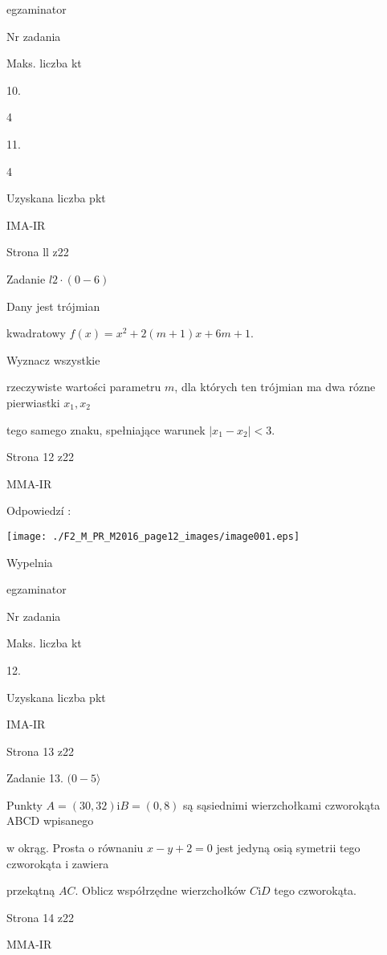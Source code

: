 \documentclass[a4paper,12pt]{article}
\begin{document}
egzaminator

Nr zadania

Maks. liczba kt

10.

4

11.

4

Uzyskana liczba pkt

IMA-IR

Strona ll z22





Zadanie $l2\cdot(0-6)$

Dany jest trójmian

kwadratowy $f(x)=x^{2}+2(m+1)x+6m+1.$

Wyznacz wszystkie

rzeczywiste wartości parametru $m$, dla których ten trójmian ma dwa rózne pierwiastki $x_{1}, x_{2}$

tego samego znaku, spełniające warunek $|x_{1}-x_{2}|<3.$

Strona 12 z22

MMA-IR





Odpowiedzí :
\begin{center}
\texttt{[image: ./F2\_M\_PR\_M2016\_page12\_images/image001.eps]}
\end{center}
Wypelnia

egzaminator

Nr zadania

Maks. liczba kt

12.

Uzyskana liczba pkt

IMA-IR

Strona 13 z22





Zadanie 13. $(0-5\rangle$

Punkty $A=(30,32) \mathrm{i} B=(0,8)$ są sąsiednimi wierzchołkami czworokąta ABCD wpisanego

w okrąg. Prosta o równaniu $x-y+2=0$ jest jedyną osią symetrii tego czworokąta i zawiera

przekątną $AC$. Oblicz współrzędne wierzchołków $C\mathrm{i}D$ tego czworokąta.

Strona 14 z22

MMA-IR
\end{document}
